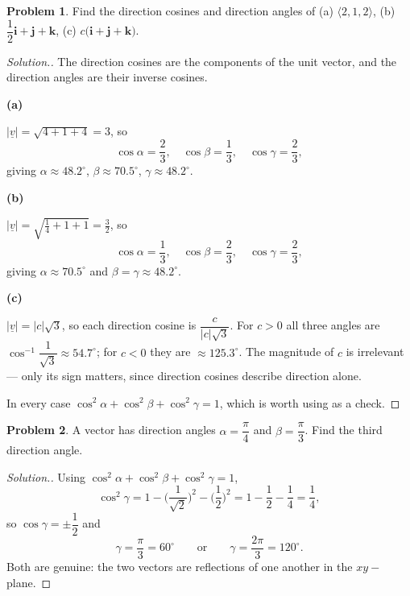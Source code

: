 \documentclass[11pt,a4paper]{article}
\theoremstyle{definition}
\newtheorem{problemx}{Problem}[subsection]
\newenvironment{problem}{\begin{problemx}}{\end{problemx}}
\newenvironment{solution}
  {\renewcommand{\qedsymbol}{}\begin{proof}[\textit{Solution}.]}
  {\end{proof}}
\newcommand{\subhead}[1]{%
  \par\medskip\noindent\textbf{#1}\par\nobreak\smallskip}
\begin{document}
\begin{problem}
Find the direction cosines and direction angles of
(a) $\langle 2,1,2\rangle$, (b) $\dfrac12\textbf{i}+\textbf{j}+\textbf{k}$,
(c) $c\big(\textbf{i}+\textbf{j}+\textbf{k}\big)$.
\end{problem}
\begin{solution}
The direction cosines are the components of the unit vector, and the direction
angles are their inverse cosines.

\subhead{(a)}
$\left|\underline{v}\right| = \sqrt{4+1+4} = 3$, so
$$\cos\alpha = \frac23,\quad \cos\beta = \frac13,\quad \cos\gamma = \frac23,$$
giving $\alpha\approx 48.2^{\circ}$, $\beta\approx 70.5^{\circ}$,
$\gamma\approx 48.2^{\circ}$.

\subhead{(b)}
$\left|\underline{v}\right| = \sqrt{\frac14+1+1} = \frac32$, so
$$\cos\alpha = \frac13,\quad \cos\beta = \frac23,\quad \cos\gamma = \frac23,$$
giving $\alpha\approx 70.5^{\circ}$ and
$\beta = \gamma\approx 48.2^{\circ}$.

\subhead{(c)}
$\left|\underline{v}\right| = \left|c\right|\sqrt3$, so each direction cosine is
$\dfrac{c}{\left|c\right|\sqrt3}$. For $c>0$ all three angles are
$\cos^{-1}\dfrac{1}{\sqrt3}\approx 54.7^{\circ}$; for $c<0$ they are
$\approx 125.3^{\circ}$. The magnitude of $c$ is irrelevant --- only its sign
matters, since direction cosines describe direction alone.

In every case $\cos^2\alpha+\cos^2\beta+\cos^2\gamma = 1$, which is worth using
as a check.
\end{solution}

\begin{problem}
A vector has direction angles $\alpha = \dfrac{\pi}{4}$ and
$\beta = \dfrac{\pi}{3}$. Find the third direction angle.
\end{problem}
\begin{solution}
Using $\cos^2\alpha + \cos^2\beta + \cos^2\gamma = 1$,
$$\cos^2\gamma = 1 - \Big(\frac{1}{\sqrt2}\Big)^2 - \Big(\frac12\Big)^2
= 1 - \frac12 - \frac14 = \frac14 ,$$
so $\cos\gamma = \pm\dfrac12$ and
$$\gamma = \frac{\pi}{3} = 60^{\circ}\qquad\text{or}\qquad
\gamma = \frac{2\pi}{3} = 120^{\circ}.$$
Both are genuine: the two vectors are reflections of one another in the
$xy-$plane.
\end{solution}
\end{document}
